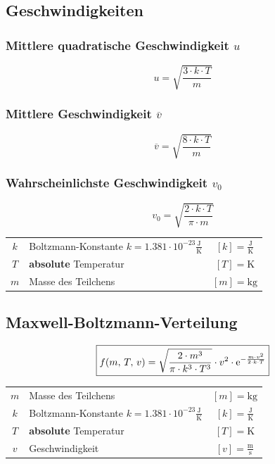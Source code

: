 \subsection{Geschwindigkeiten}

\subsubsection{Mittlere quadratische Geschwindigkeit  $u$}

$$ \boxed{ u = \sqrt{\frac{3 \cdot k \cdot T}{m}} }  $$


\subsubsection{Mittlere Geschwindigkeit $\overline{v}$}

$$ \boxed{ \overline{v} = \sqrt{\frac{8 \cdot k \cdot T}{m}} }  $$


\subsubsection{Wahrscheinlichste Geschwindigkeit $v_0$}

$$ \boxed{ v_0 = \sqrt{\frac{2 \cdot k \cdot T}{\pi \cdot m}}   }  $$




\begin{tabular}{c l c}
	\rule{0pt}{8pt}$k$ & Boltzmann-Konstante $k = 1.381 \cdot 10^{-23} \mathrm{\frac{J}{K}}$ & $[k] = \mathrm{\frac{J}{K}}$ \\
	$T$ & \textbf{absolute} Temperatur & $[T] = \mathrm{K}$ \\
	$m$ & Masse des Teilchens & $[m] = \mathrm{kg}$ \\
\end{tabular}




\subsection{Maxwell-Boltzmann-Verteilung}

$$ \boxed{ f(m, \, T, \, v) = \sqrt{\frac{2 \cdot m^3}{\pi \cdot k^3 \cdot T^3 }}  \cdot v^2 \cdot \mathrm{e} ^{- \frac{m \cdot v^2}{2 \cdot k \cdot T}}  }  $$


\begin{tabular}{c l c}
	$m$ & Masse des Teilchens & $[m] = \mathrm{kg}$ \\
	\rule{0pt}{8pt}$k$ & Boltzmann-Konstante $k = 1.381 \cdot 10^{-23} \mathrm{\frac{J}{K}}$ & $[k] = \mathrm{\frac{J}{K}}$ \\
	$T$ & \textbf{absolute} Temperatur & $[T] = \mathrm{K}$ \\
	\rule{0pt}{8pt}$v$ & Geschwindigkeit & $[v] = \mathrm{\frac{m}{s}}$ \\
\end{tabular}





